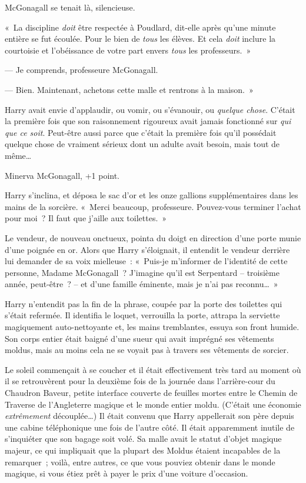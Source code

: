 McGonagall se tenait là, silencieuse.

«~La discipline \emph{doit} être respectée à Poudlard, dit-elle après qu'une minute entière se fut écoulée. Pour le bien de \emph{tous} les élèves. Et cela \emph{doit} inclure la courtoisie et l'obéissance de votre part envers \emph{tous} les professeurs.~»

--- Je comprends, professeure McGonagall.

--- Bien. Maintenant, achetons cette malle et rentrons à la maison.~»

Harry avait envie d'applaudir, ou vomir, ou s'évanouir, ou \emph{quelque chose}.
C'était la première fois que son raisonnement rigoureux avait jamais fonctionné sur \emph{qui que ce soit}.
Peut-être aussi parce que c'était la première fois qu'il possédait quelque chose de vraiment sérieux dont un adulte avait besoin, mais tout de même…

Minerva McGonagall, +1 point.

Harry s'inclina, et déposa le sac d'or et les onze gallions supplémentaires dans les mains de la sorcière.
«~Merci beaucoup, professeure. Pouvez-vous terminer l'achat pour moi~?
Il faut que j'aille aux toilettes.~»

Le vendeur, de nouveau onctueux, pointa du doigt en direction d'une porte munie d'une poignée en or.
Alors que Harry s'éloignait, il entendit le vendeur derrière lui demander de sa voix mielleuse~:
«~Puis-je m'informer de l'identité de cette personne, Madame McGonagall~? J'imagine qu'il est Serpentard -- troisième année, peut-être~? -- et d'une famille éminente, mais je n'ai pas reconnu…~»

Harry n'entendit pas la fin de la phrase, coupée par la porte des toilettes qui s'était refermée.
Il identifia le loquet, verrouilla la porte, attrapa la serviette magiquement auto-nettoyante et, les mains tremblantes, essuya son front humide.
Son corps entier était baigné d'une sueur qui avait imprégné ses vêtements moldus, mais au moins cela ne se voyait pas à travers ses vêtements de sorcier.

\later

Le soleil commençait à se coucher et il était effectivement très tard au moment où il se retrouvèrent pour la deuxième fois de la journée dans l'arrière-cour du Chaudron Baveur, petite interface couverte de feuilles mortes entre le Chemin de Traverse de l'Angleterre magique et le monde entier moldu.
(C'était une économie \emph{extrêmement} découplée…) 
Il était convenu que Harry appellerait son père depuis une cabine téléphonique une fois de l'autre côté.
Il était apparemment inutile de s'inquiéter que son bagage soit volé.
Sa malle avait le statut d'objet magique majeur, ce qui impliquait que la plupart des Moldus étaient incapables de la remarquer~;
voilà, entre autres, ce que vous pouviez obtenir dans le monde magique, si vous étiez prêt à payer le prix d'une voiture d'occasion.

